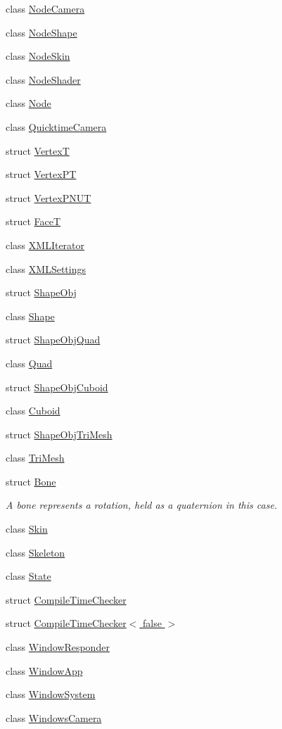 \begin{DoxyCompactItemize}
class \hyperlink{classs9_1_1NodeCamera}{Node\-Camera}
\item 
class \hyperlink{classs9_1_1NodeShape}{Node\-Shape}
\item 
class \hyperlink{classs9_1_1NodeSkin}{Node\-Skin}
\item 
class \hyperlink{classs9_1_1NodeShader}{Node\-Shader}
\item 
class \hyperlink{classs9_1_1Node}{Node}
\item 
class \hyperlink{classs9_1_1QuicktimeCamera}{Quicktime\-Camera}
\item 
struct \hyperlink{structs9_1_1VertexT}{Vertex\-T}
\item 
struct \hyperlink{structs9_1_1VertexPT}{Vertex\-P\-T}
\item 
struct \hyperlink{structs9_1_1VertexPNUT}{Vertex\-P\-N\-U\-T}
\item 
struct \hyperlink{structs9_1_1FaceT}{Face\-T}
\item 
class \hyperlink{classs9_1_1XMLIterator}{X\-M\-L\-Iterator}
\item 
class \hyperlink{classs9_1_1XMLSettings}{X\-M\-L\-Settings}
\item 
struct \hyperlink{structs9_1_1ShapeObj}{Shape\-Obj}
\item 
class \hyperlink{classs9_1_1Shape}{Shape}
\item 
struct \hyperlink{structs9_1_1ShapeObjQuad}{Shape\-Obj\-Quad}
\item 
class \hyperlink{classs9_1_1Quad}{Quad}
\item 
struct \hyperlink{structs9_1_1ShapeObjCuboid}{Shape\-Obj\-Cuboid}
\item 
class \hyperlink{classs9_1_1Cuboid}{Cuboid}
\item 
struct \hyperlink{structs9_1_1ShapeObjTriMesh}{Shape\-Obj\-Tri\-Mesh}
\item 
class \hyperlink{classs9_1_1TriMesh}{Tri\-Mesh}
\item 
struct \hyperlink{structs9_1_1Bone}{Bone}
\begin{DoxyCompactList}\small\item\em A bone represents a rotation, held as a quaternion in this case. \end{DoxyCompactList}\item 
class \hyperlink{classs9_1_1Skin}{Skin}
\item 
class \hyperlink{classs9_1_1Skeleton}{Skeleton}
\item 
class \hyperlink{classs9_1_1State}{State}
\item 
struct \hyperlink{structs9_1_1CompileTimeChecker}{Compile\-Time\-Checker}
\item 
struct \hyperlink{structs9_1_1CompileTimeChecker_3_01false_01_4}{Compile\-Time\-Checker$<$ false $>$}
\item 
class \hyperlink{classs9_1_1WindowResponder}{Window\-Responder}
\item 
class \hyperlink{classs9_1_1WindowApp}{Window\-App}
\item 
class \hyperlink{classs9_1_1WindowSystem}{Window\-System}
\item 
class \hyperlink{classs9_1_1WindowsCamera}{Windows\-Camera}
\end{DoxyCompactItemize}
